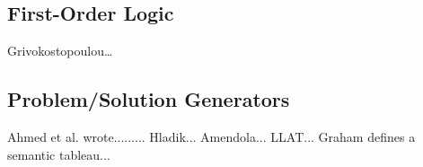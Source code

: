 \documentclass[ms]{uncgdissertationexp2}
\theoremstyle{plain}
\theoremstyle{definition}
\theoremstyle{remark}
\begin{document}
\subsection{First-Order Logic}
Grivokostopoulou…
\subsection{Problem/Solution Generators}
Ahmed et al. wrote.........
Hladik...
Amendola...
LLAT... Graham defines a semantic tableau...
\end{document}
